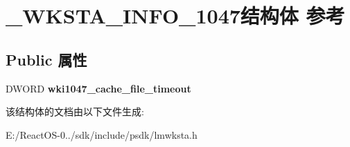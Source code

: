 \hypertarget{struct___w_k_s_t_a___i_n_f_o__1047}{}\section{\+\_\+\+W\+K\+S\+T\+A\+\_\+\+I\+N\+F\+O\+\_\+1047结构体 参考}
\label{struct___w_k_s_t_a___i_n_f_o__1047}
\subsection*{Public 属性}
\begin{DoxyCompactItemize}
\item 
\mbox{\label{struct___w_k_s_t_a___i_n_f_o__1047_abbe468ea384c97445306c490b814c9c8}} 
D\+W\+O\+RD {\bfseries wki1047\+\_\+cache\+\_\+file\+\_\+timeout}
\end{DoxyCompactItemize}


该结构体的文档由以下文件生成\+:\begin{DoxyCompactItemize}
\item 
E\+:/\+React\+O\+S-\/0../sdk/include/psdk/lmwksta.\+h\end{DoxyCompactItemize}
